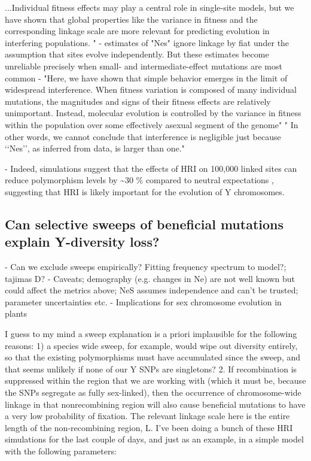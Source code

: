 \documentclass[9pt,twocolumn,twoside]{gsajnl}
\begin{document}
...Individual fitness effects may play a central role in single-site models, but we have shown that global properties like the variance in fitness and the corresponding linkage scale are more relevant for predicting evolution in interfering populations. " - estimates of "Nes" ignore linkage by fiat under the assumption that sites evolve independently. But these estimates become unreliable precisely when small- and intermediate-effect mutations are most common - "Here, we have shown that simple behavior emerges in the limit of widespread interference. When fitness variation is composed of many individual mutations, the magnitudes and signs of their fitness effects are relatively unimportant. Instead, molecular evolution is controlled by the variance in fitness within the population over some effectively asexual segment of the genome" " In other words, we cannot conclude that interference is negligible just because ‘‘Nes’’, as inferred from data, is larger than one."

- Indeed, simulations suggest that the effects of HRI on 100,000 linked sites can reduce polymorphism levels by \textasciitilde 30 \% compared to neutral expectations \citep{mcvean2000}, suggesting that HRI is likely important for the evolution of Y chromosomes.

\subsection*{Can selective sweeps of beneficial mutations explain Y-diversity loss?}
- Can we exclude sweeps empirically? Fitting frequency spectrum to model?; tajimas D?
- Caveats; demography (e.g. changes in Ne) are not well known but could affect the metrics above; NeS assumes independence and can't be trusted; parameter uncertainties etc.
- Implications for sex chromosome evolution in plants


I guess to my mind a sweep explanation is a priori implausible for the following reasons: 1) a species wide sweep, for example, would wipe out diversity entirely, so that the existing polymorphisms must have accumulated since the sweep, and that seems unlikely if none of our Y SNPs are singletons? 2. If recombination is suppressed within the region that we are working with (which it must be, because the SNPs segregate as fully sex-linked), then the occurrence of chromosome-wide linkage in that nonrecombining region will also cause beneficial mutations to have a very low probability of fixation. The relevant linkage scale here is the entire length of the non-recombining region, L. I've been doing a bunch of these HRI simulations for the last couple of days, and just as an example, in a simple model with the following parameters:
\end{document}
